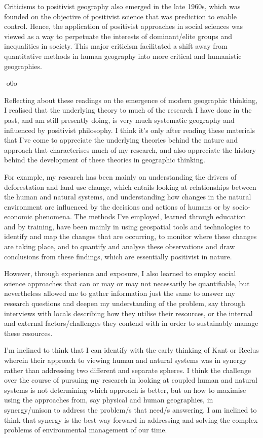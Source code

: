 \documentclass[a4paper, 10.5pt]{article} %
\begin{document}
Criticisms to positivist geography also emerged in the late 1960s, which was founded on the objective of positivist science that was prediction to enable control. Hence, the application of positivist approaches in social sciences was viewed as a way to perpetuate the interests of dominant/elite groups and inequalities in society. This major criticism facilitated a shift away from quantitative methods in human geography into more critical and humanistic geographies.

\begin{center}
-o0o-
\end{center}

Reflecting about these readings on the emergence of modern geographic thinking, I realised that the underlying theory to much of the research I have done in the past, and am still presently doing, is very much systematic geography and influenced by positivist philosophy. I think it's only after reading these materials that I've come to appreciate the underlying theories behind the nature and approach that characterises much of my research, and also appreciate the history behind the development of these theories in geographic thinking.

For example, my research has been mainly on understanding the drivers of deforestation and land use change, which entails looking at relationships between the human and natural systems, and understanding how changes in the natural environment are influenced by the decisions and actions of humans or by socio-economic phenomena. The methods I've employed, learned through education and by training, have been mainly in using geospatial tools and technologies to identify and map the changes that are occurring, to monitor where these changes are taking place, and to quantify and analyse these observations and draw conclusions from these findings, which are essentially positivist in nature.

However, through experience and exposure, I also learned to employ social science approaches that can or may or may not necessarily be quantifiable, but nevertheless allowed me to gather information just the same to answer my research questions and deepen my understanding of the problem, say through interviews with locals describing how they utilise their resources, or the internal and external factors/challenges they contend with in order to sustainably manage these resources.

I'm inclined to think that I can identify with the early thinking of Kant or Reclus wherein their approach to viewing human and natural systems was in synergy rather than addressing two different and separate spheres. I think the challenge over the course of pursuing my research in looking at coupled human and natural systems is not determining which approach is better, but on how to maximise using the approaches from, say physical and human geographies, in synergy/unison to address the problem/s that need/s answering. I am inclined to think that synergy is the best way forward in addressing and solving the complex problems of environmental management of our time.
\end{document}
